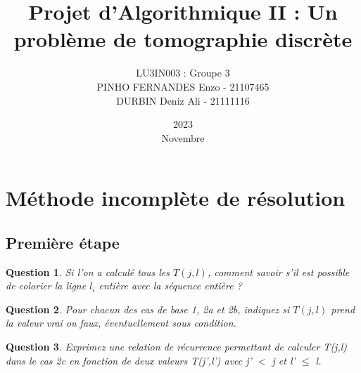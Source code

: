\documentclass[a4paper,12pt]{article}
\title{Projet d'Algorithmique II : Un problème de tomographie discrète}
\date{2023\\ Novembre}
\author{LU3IN003 : Groupe 3 \\ PINHO FERNANDES Enzo - 21107465 \\ DURBIN Deniz Ali - 21111116}
\newtheorem{exo}{Question}
\begin{document}
\maketitle
\tableofcontents
\newpage


\section{Méthode incomplète de résolution}


\subsection{Première étape}

\begin{exo}
	Si l'on a calculé tous les $T(j,l)$, comment savoir s'il est possible de colorier la ligne $l_i$ entière avec la séquence entière ?
\end{exo}

\blindtext


\begin{exo}
	Pour chacun des cas de base 1, 2a et 2b, indiquez si $T(j,l)$ prend la valeur vrai ou faux, éventuellement sous condition.
\end{exo}

\blindtext


\begin{exo}
	Exprimez une relation de récurrence permettant de calculer T(j,l) dans le cas 2c en fonction de deux valeurs T(j',l') avec j' $\lt$ j et l' $\leq$ l.
\end{exo}

\blindtext
\end{document}
